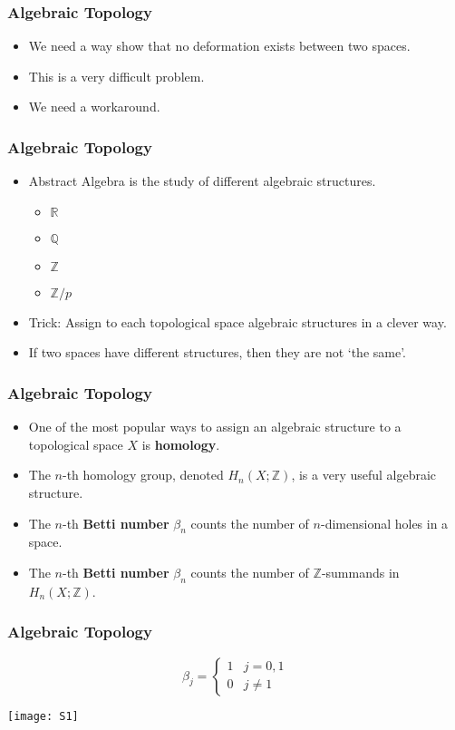 \begin{frame}
\frametitle{Algebraic Topology}
\begin{itemize}
\item<1-> We need a way show that no deformation exists between two spaces.
\item<2-> This is a very difficult problem.
\item<3-> We need a workaround.
\end{itemize}
\end{frame}

\begin{frame}
\frametitle{Algebraic Topology}
\begin{itemize}
\item<1-> Abstract Algebra is the study of different {\color{red}algebraic structures}.
	\begin{itemize}
	\item<2-> $\mathbb{R}$
	\item<2-> $\mathbb{Q}$
	\item<2-> $\mathbb{Z}$
	\item<2-> $\mathbb{Z}/p$
	\end{itemize}
\item<3-> Trick: Assign to each topological space algebraic structures in a clever way. 
\item<4-> If two spaces have different structures, then they are not `the same'.
\end{itemize}
\end{frame}


\begin{frame}
\frametitle{Algebraic Topology}
\begin{itemize}
\item<1-> One of the most popular ways to assign an algebraic structure to a topological space $X$ is \textbf{homology}.
\item<2-> The $n$-th homology group, denoted $H_n(X; \mathbb{Z})$, is a very useful algebraic structure.
\item<3-> The $n$-th \textbf{Betti number} $\beta_n$ counts the number of $n$-dimensional holes in a space.
\item<4-> The $n$-th \textbf{Betti number} $\beta_n$ counts the number of $\mathbb{Z}$-summands in $H_n(X;\mathbb{Z})$.
\end{itemize}
\end{frame}

\begin{frame}
\frametitle{Algebraic Topology}
\[ \beta_j = \begin{cases} 
      	1 & j = 0, 1 \\
      	0 & j \neq 1 
   \end{cases}
\]
\begin{center}
\texttt{[image: S1]}
\end{center}
\end{frame}

